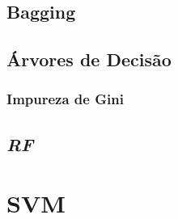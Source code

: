 \subsection{Bagging}



\subsection{Árvores de Decisão}

\subsubsection{Impureza de Gini}

\subsection{\textit{\acrshort{RF}}}


\section{\acrfull{SVM}}


